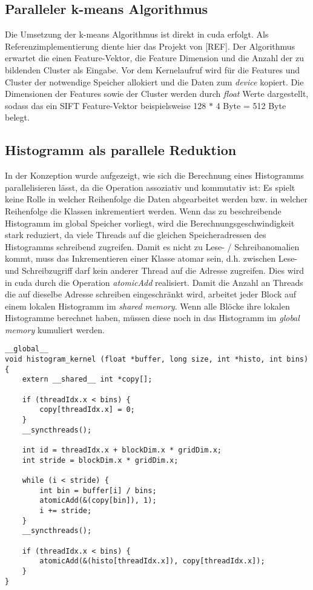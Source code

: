 \subsection{Paralleler k-means Algorithmus}

Die Umsetzung der k-means Algorithmus ist direkt in cuda erfolgt. Als Referenzimplementierung diente hier das Projekt von [REF]. Der Algorithmus erwartet die einen Feature-Vektor, die Feature Dimension und die Anzahl der zu bildenden Cluster als Eingabe. Vor dem Kernelaufruf wird für die Features und Cluster der notwendige Speicher allokiert und die Daten zum \textit{device} kopiert. Die Dimensionen der Features sowie der Cluster werden durch \textit{float} Werte dargestellt, sodass das ein SIFT Feature-Vektor beispielsweise 128 $*$ 4 Byte = 512 Byte belegt. 

\subsection{Histogramm als parallele Reduktion}

In der Konzeption wurde aufgezeigt, wie sich die Berechnung eines Histogramms parallelisieren lässt, da die Operation assoziativ und kommutativ ist: Es spielt keine Rolle in welcher Reihenfolge die Daten abgearbeitet werden bzw. in welcher Reihenfolge die Klassen inkrementiert werden. Wenn das zu beschreibende Histogramm im global Speicher vorliegt, wird die Berechnungsgeschwindigkeit stark reduziert, da viele Threads auf die gleichen Speicheradressen des Histogramms schreibend zugreifen. Damit es nicht zu Lese- / Schreibanomalien kommt, muss das Inkrementieren einer Klasse atomar sein, d.h. zwischen Lese- und Schreibzugriff darf kein anderer Thread auf die Adresse zugreifen. Dies wird in cuda durch die Operation \textit{atomicAdd} realisiert. Damit die Anzahl an Threads die auf dieselbe Adresse schreiben eingeschränkt wird, arbeitet jeder Block auf einem lokalen Histogramm im \textit{shared memory}. Wenn alle Blöcke ihre lokalen Histogramme berechnet haben, müssen diese noch in das Histogramm im \textit{global memory} kumuliert werden.

\lstset{language=C}
\begin{lstlisting}
__global__
void histogram_kernel (float *buffer, long size, int *histo, int bins) {
	extern __shared__ int *copy[];
	
	if (threadIdx.x < bins) {
		copy[threadIdx.x] = 0;		
	}
	__syncthreads();

	int id = threadIdx.x + blockDim.x * gridDim.x;
	int stride = blockDim.x * gridDim.x;
	
	while (i < stride) {
		int bin = buffer[i] / bins; 
		atomicAdd(&(copy[bin]), 1);
		i += stride;	
	}
	__syncthreads();
	
	if (threadIdx.x < bins) {
		atomicAdd(&(histo[threadIdx.x]), copy[threadIdx.x]);		
	}
}
\end{lstlisting} 


